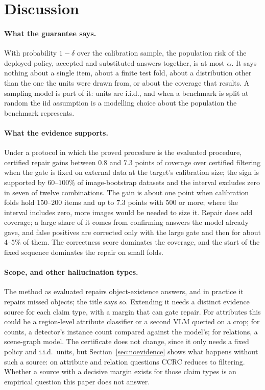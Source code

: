 \section{Discussion}
\label{sec:discussion}

\paragraph{What the guarantee says.}
With probability $1-\delta$ over the calibration sample, the population risk of the deployed policy, accepted and
substituted answers together, is at most $\alpha$. It says nothing about a single item, about a finite test fold, about
a distribution other than the one the units were drawn from, or about the coverage that results. A sampling model is
part of it: units are i.i.d., and when a benchmark is split at random the iid assumption is a modelling choice about the population
the benchmark represents.

\paragraph{What the evidence supports.}
Under a protocol in which the proved procedure is the evaluated procedure, certified repair gains between $0.8$ and $7.3$ points
of coverage over certified filtering when the gate is fixed on external data at the target's calibration size; the sign is supported by
$60$--$100\%$ of image-bootstrap datasets and the interval excludes zero in seven of twelve combinations. The gain is about one point
when calibration folds hold $150$--$200$ items and up to $7.3$ points with $500$ or more; where the interval includes zero, more images
would be needed to size it. Repair does add coverage; a large share of it
comes from confirming answers the model already gave, and false positives are corrected only with the large gate and then for about
$4$--$5\%$ of them.
The correctness score dominates the coverage, and the start of the fixed sequence dominates the repair on small folds.

\paragraph{Scope, and other hallucination types.}
The method as evaluated repairs object-existence answers, and in practice it repairs missed objects; the title says so. Extending it needs a
distinct evidence source for each claim type, with a margin that can gate repair. For attributes this could be a region-level attribute classifier or a
second VLM queried on a crop; for counts, a detector's instance count compared against the model's; for relations, a scene-graph model. The certificate
does not change, since it only needs a fixed policy and i.i.d.\ units, but Section~\ref{sec:noevidence} shows what happens without such a source:
on attribute and relation questions CCRC reduces to filtering. Whether a source with a decisive margin exists for those claim types is an empirical question this
paper does not answer.

